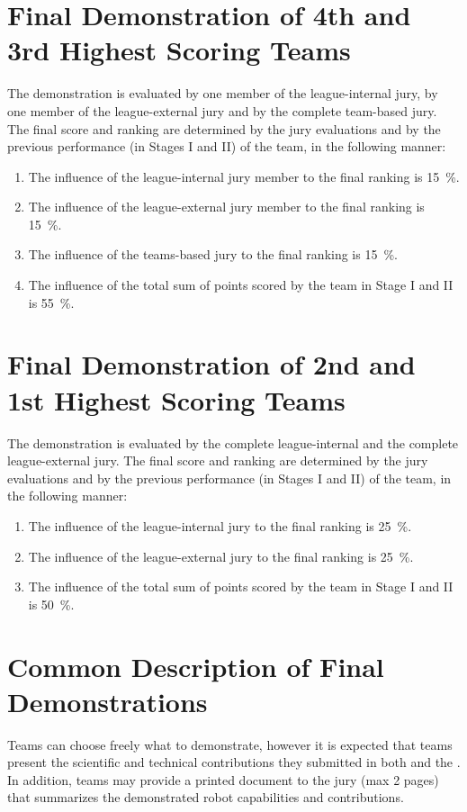 \section{Final Demonstration of 4th and 3rd Highest Scoring Teams}
The demonstration is evaluated by one member of the league-internal jury, by one member of the league-external jury and by the complete team-based jury.
The final score and ranking are determined by the jury evaluations and by the previous performance (in Stages I and II) of the team, in the following manner:

\begin{enumerate}
  \item The influence of the league-internal jury member to the final ranking is \SI{15}{\percent}.
  \item The influence of the league-external jury member to the final ranking is \SI{15}{\percent}.
  \item The influence of the teams-based jury to the final ranking is \SI{15}{\percent}.
  \item The influence of the total sum of points scored by the team in Stage I and II is \SI{55}{\percent}.
\end{enumerate}


\section{Final Demonstration of 2nd and 1st Highest Scoring Teams}
The demonstration is evaluated by the complete league-internal and the complete league-external jury.
The final score and ranking are determined by the jury evaluations and by the previous performance (in Stages I and II) of the team, in the following manner:
  
\begin{enumerate}
  \item The influence of the league-internal jury to the final ranking is \SI{25}{\percent}.
  \item The influence of the league-external jury to the final ranking is \SI{25}{\percent}.
  \item The influence of the total sum of points scored by the team in Stage I and II is \SI{50}{\percent}.
\end{enumerate}
  
\section{Common Description of Final Demonstrations}
Teams can choose freely what to demonstrate, however it is expected that teams present the scientific and technical contributions they submitted in both  and the .
In addition, teams may provide a printed document to the jury (max 2 pages) that summarizes the demonstrated robot capabilities and contributions.  

